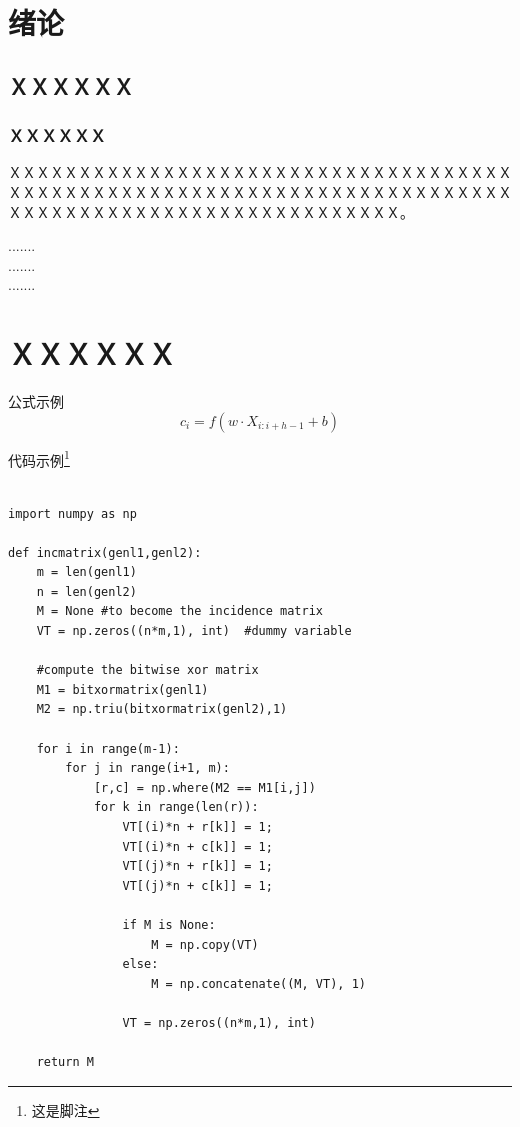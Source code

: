 

\setcounter{page}{1}
\pretocmd{\section}{\clearpage \vspace*{-2.0em}}{}{}

\setlength{\parindent}{2em}
\setlength{\parskip}{0.5em}
\setlength{\baselineskip}{22pt}


\section{绪论}
\subsection{ＸＸＸＸＸＸ}
\subsubsection{ＸＸＸＸＸＸ}
ＸＸＸＸＸＸＸＸＸＸＸＸＸＸＸＸＸＸＸＸＸＸＸＸＸＸＸＸＸＸＸＸＸＸＸＸＸＸＸＸＸＸＸＸＸＸＸＸＸＸＸＸＸＸＸＸＸＸＸＸＸＸＸＸＸＸＸＸＸＸＸＸＸＸＸＸＸＸＸＸＸＸＸＸＸＸＸＸＸＸＸＸＸＸＸＸＸＸＸＸ。

\begin{center}
    .......\\
    .......\\
    .......
\end{center}

\section{ＸＸＸＸＸＸ}

公式示例
\begin{equation}
	c_i=f(w \cdot X_{i:i+h-1} +b)
\end{equation}

代码示例\footnote{这是脚注}
\begin{verbatim}

import numpy as np

def incmatrix(genl1,genl2):
    m = len(genl1)
    n = len(genl2)
    M = None #to become the incidence matrix
    VT = np.zeros((n*m,1), int)  #dummy variable

    #compute the bitwise xor matrix
    M1 = bitxormatrix(genl1)
    M2 = np.triu(bitxormatrix(genl2),1)

    for i in range(m-1):
        for j in range(i+1, m):
            [r,c] = np.where(M2 == M1[i,j])
            for k in range(len(r)):
                VT[(i)*n + r[k]] = 1;
                VT[(i)*n + c[k]] = 1;
                VT[(j)*n + r[k]] = 1;
                VT[(j)*n + c[k]] = 1;

                if M is None:
                    M = np.copy(VT)
                else:
                    M = np.concatenate((M, VT), 1)

                VT = np.zeros((n*m,1), int)

    return M
\end{verbatim}


